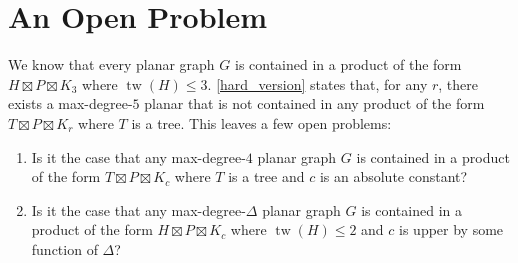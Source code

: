 \documentclass{patmorin}
\DeclareMathOperator{\tw}{tw}
\begin{document}
\section{An Open Problem}

We know that every planar graph $G$ is contained in a product of the form $H\boxtimes P\boxtimes K_3$ where $\tw(H)\le 3$. \cref{hard_version} states that, for any $r$, there exists a max-degree-$5$ planar that is not contained in any product of the form $T\boxtimes P\boxtimes K_r$ where $T$ is a tree.  This leaves a few open problems:

\begin{enumerate}
  \item Is it the case that any max-degree-$4$ planar graph $G$ is contained in a product of the form $T\boxtimes P\boxtimes K_c$ where $T$ is a tree and $c$ is an absolute constant?

  \item Is it the case that any max-degree-$\Delta$ planar graph $G$ is contained in a product of the form $H\boxtimes P\boxtimes K_c$ where $\tw(H)\le 2$ and $c$ is upper by some function of $\Delta$?
\end{enumerate}




\end{document}
